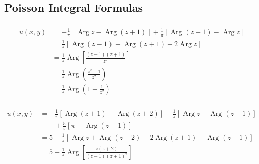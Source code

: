 \documentclass{article}
\newcommand{\Arg}{\operatorname{Arg}}
\begin{document}
\subsection{Poisson Integral Formulas}

\subsubsection{}

\begin{align*}
  u(x, y) & = -\frac{1}{\pi} [\Arg z - \Arg (z + 1)] + \frac{1}{\pi} [\Arg (z - 1) - \Arg z] \\
          & = \frac{1}{\pi} [\Arg (z - 1) + \Arg (z + 1) - 2 \Arg z]                         \\
          & = \frac{1}{\pi} \Arg \left[ \frac{(z - 1) (z + 1)}{z^2} \right]                  \\
          & = \frac{1}{\pi} \Arg \left( \frac{z^2 - 1}{z^2} \right)                          \\
          & = \frac{1}{\pi} \Arg \left( 1 - \frac{1}{z^2} \right)
\end{align*}

\setcounter{subsubsection}{2}
\subsubsection{}

\begin{align*}
  u(x, y) & = -\frac{1}{\pi} [\Arg (z + 1) - \Arg (z + 2)] + \frac{1}{\pi} [\Arg z - \Arg (z + 1)] \\
          & \qquad + \frac{5}{\pi} [\pi - \Arg (z - 1)]                                            \\
          & = 5 + \frac{1}{\pi} [\Arg z + \Arg (z + 2) - 2 \Arg (z + 1) - \Arg (z - 1)]            \\
          & = 5 + \frac{1}{\pi} \Arg \left[ \frac{z (z + 2)}{(z - 1) (z + 1)^2} \right]
\end{align*}

\setcounter{subsubsection}{4}
\subsubsection{}
\end{document}
